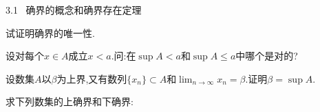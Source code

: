 \documentclass{exam}
\begin{document}
\begin{center}
    \Large 3.1 \, 确界的概念和确界存在定理
\end{center}

\begin{questions}
    \question
    试证明确界的唯一性.

    \question
    设对每个$x\in A$成立$x<a$.问:在$\sup A<a$和$\sup A\leqslant a$中哪个是对的?

    \question
    设数集$A$以$\beta$为上界,又有数列$\{x_n\}\subset A$和$\lim_{n\to\infty}x_n=\beta.$证明$\beta=\sup A$.

    \question
    求下列数集的上确界和下确界:


\end{questions}
\end{document}
